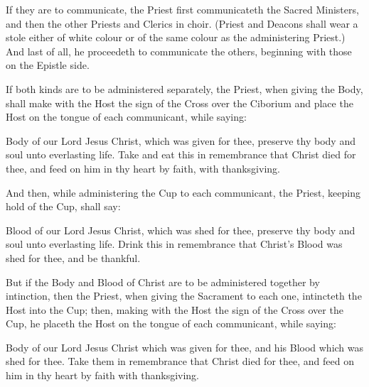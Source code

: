 \begin{rubric}
    If they are to communicate, the Priest first communicateth the Sacred Ministers, and then the other Priests and Clerics in choir. (Priest and Deacons shall wear a stole either of white colour or of the same colour as the administering Priest.) And last of all, he proceedeth to communicate the others, beginning with those on the Epistle side.
\end{rubric}
\begin{rubric}
    If both kinds are to be administered separately, the Priest, when giving the Body, shall make with the Host the sign of the Cross over the Ciborium and place the Host on the tongue of each communicant, while saying:
\end{rubric}
  Body of our Lord Jesus Christ, which was given for thee, preserve thy body and soul unto everlasting life. Take and eat this in remembrance that Christ died for thee, and feed on him in thy heart by faith, with thanksgiving.
\begin{rubric}
    And then, while administering the Cup to each communicant, the Priest, keeping hold of the Cup, shall say:
\end{rubric}
 Blood of our Lord Jesus Christ, which was shed for thee, preserve thy body and soul unto everlasting life. Drink this in remembrance that Christ's Blood was shed for thee, and be thankful.
\begin{rubric}
    But if the Body and Blood of Christ are to be administered together by intinction, then the Priest, when giving the Sacrament to each one, intincteth the Host into the Cup; then, making with the Host the sign of the Cross over the Cup, he placeth the Host on the tongue of each communicant, while saying:
\end{rubric}
 Body of our Lord Jesus Christ which was given for thee, and his Blood which was shed for thee. Take them in remembrance that Christ died for thee, and feed on him in thy heart by faith with thanksgiving.

